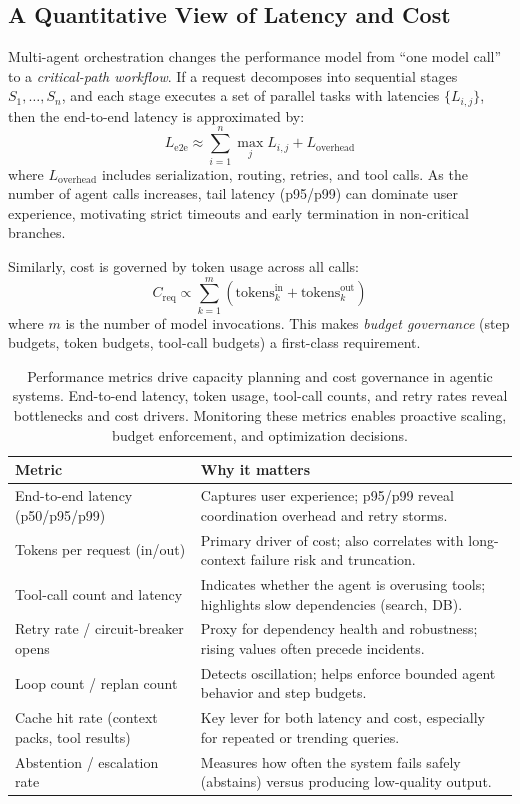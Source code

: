 \subsection{A Quantitative View of Latency and Cost}
Multi-agent orchestration changes the performance model from ``one model call'' to a \emph{critical-path workflow}.
If a request decomposes into sequential stages $S_1,\dots,S_n$, and each stage executes a set of parallel tasks with latencies $\{L_{i,j}\}$, then the end-to-end latency is approximated by:
\[
  L_{\text{e2e}} \approx \sum_{i=1}^{n} \max_j L_{i,j} + L_{\text{overhead}}
\]
where $L_{\text{overhead}}$ includes serialization, routing, retries, and tool calls.
As the number of agent calls increases, tail latency (p95/p99) can dominate user experience, motivating strict timeouts and early termination in non-critical branches.

Similarly, cost is governed by token usage across all calls:
\[
  C_{\text{req}} \propto \sum_{k=1}^{m} (\text{tokens}_{k}^{\text{in}} + \text{tokens}_{k}^{\text{out}})
\]
where $m$ is the number of model invocations. This makes \emph{budget governance} (step budgets, token budgets, tool-call budgets) a first-class requirement.

\begin{table}[t]
\centering
\small
\caption{Performance metrics drive capacity planning and cost governance in agentic systems. End-to-end latency, token usage, tool-call counts, and retry rates reveal bottlenecks and cost drivers. Monitoring these metrics enables proactive scaling, budget enforcement, and optimization decisions.}
\label{tab:ch09_agent_performance_metrics}
\setlength{\tabcolsep}{6pt}
\renewcommand{\arraystretch}{1.3}
\begin{tabularx}{\linewidth}{@{}p{3.5cm}X@{}}
\toprule
\rowcolor{gray!15}
\textbf{Metric} & \textbf{Why it matters} \\
\midrule
End-to-end latency (p50/p95/p99) & Captures user experience; p95/p99 reveal coordination overhead and retry storms. \\
Tokens per request (in/out) & Primary driver of cost; also correlates with long-context failure risk and truncation. \\
Tool-call count and latency & Indicates whether the agent is overusing tools; highlights slow dependencies (search, DB). \\
Retry rate / circuit-breaker opens & Proxy for dependency health and robustness; rising values often precede incidents. \\
Loop count / replan count & Detects oscillation; helps enforce bounded agent behavior and step budgets. \\
Cache hit rate (context packs, tool results) & Key lever for both latency and cost, especially for repeated or trending queries. \\
Abstention / escalation rate & Measures how often the system fails safely (abstains) versus producing low-quality output. \\
\bottomrule
\end{tabularx}
\end{table}

